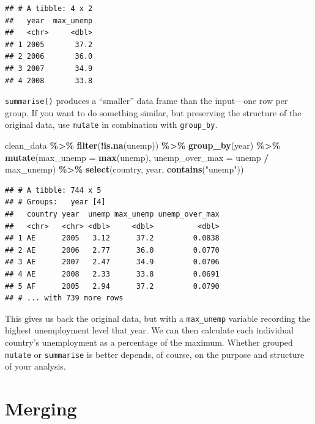 \documentclass[
  12pt,
  oneside,openany]{book}
\newenvironment{Shaded}{\begin{snugshade}}{\end{snugshade}}
\newcommand{\DataTypeTok}[1]{\textcolor[rgb]{0.13,0.29,0.53}{#1}}
\newcommand{\KeywordTok}[1]{\textcolor[rgb]{0.13,0.29,0.53}{\textbf{#1}}}
\newcommand{\NormalTok}[1]{#1}
\newcommand{\OperatorTok}[1]{\textcolor[rgb]{0.81,0.36,0.00}{\textbf{#1}}}
\newcommand{\StringTok}[1]{\textcolor[rgb]{0.31,0.60,0.02}{#1}}
\begin{document}
\begin{verbatim}
## # A tibble: 4 x 2
##   year  max_unemp
##   <chr>     <dbl>
## 1 2005       37.2
## 2 2006       36.0
## 3 2007       34.9
## 4 2008       33.8
\end{verbatim}

\texttt{summarise()} produces a ``smaller'' data frame than the input---one row per group. If you want to do something similar, but preserving the structure of the original data, use \texttt{mutate} in combination with \texttt{group\_by}.

\begin{Shaded}
\begin{Highlighting}[]
\NormalTok{clean\_data }\OperatorTok{\%\textgreater{}\%}
\StringTok{  }\KeywordTok{filter}\NormalTok{(}\OperatorTok{!}\KeywordTok{is.na}\NormalTok{(unemp)) }\OperatorTok{\%\textgreater{}\%}
\StringTok{  }\KeywordTok{group\_by}\NormalTok{(year) }\OperatorTok{\%\textgreater{}\%}
\StringTok{  }\KeywordTok{mutate}\NormalTok{(}\DataTypeTok{max\_unemp =} \KeywordTok{max}\NormalTok{(unemp),}
         \DataTypeTok{unemp\_over\_max =}\NormalTok{ unemp }\OperatorTok{/}\StringTok{ }\NormalTok{max\_unemp) }\OperatorTok{\%\textgreater{}\%}
\StringTok{  }\KeywordTok{select}\NormalTok{(country, year, }\KeywordTok{contains}\NormalTok{(}\StringTok{"unemp"}\NormalTok{))}
\end{Highlighting}
\end{Shaded}

\begin{verbatim}
## # A tibble: 744 x 5
## # Groups:   year [4]
##   country year  unemp max_unemp unemp_over_max
##   <chr>   <chr> <dbl>     <dbl>          <dbl>
## 1 AE      2005   3.12      37.2         0.0838
## 2 AE      2006   2.77      36.0         0.0770
## 3 AE      2007   2.47      34.9         0.0706
## 4 AE      2008   2.33      33.8         0.0691
## 5 AF      2005   2.94      37.2         0.0790
## # ... with 739 more rows
\end{verbatim}

This gives us back the original data, but with a \texttt{max\_unemp} variable recording the highest unemployment level that year. We can then calculate each individual country's unemployment as a percentage of the maximum. Whether grouped \texttt{mutate} or \texttt{summarise} is better depends, of course, on the purpose and structure of your analysis.

\hypertarget{merging}{%
\section{Merging}\label{merging}}
\end{document}
